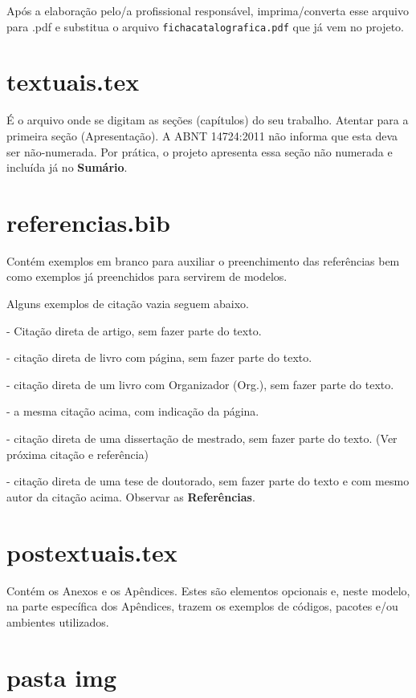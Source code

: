 \documentclass[a4paper,12pt,oneside,openright,extrafontsizes,openbib]{memoir}
\begin{document}
{{Após a elaboração pelo/a profissional responsável, imprima/converta esse arquivo para .pdf e substitua o arquivo \verb|fichacatalografica.pdf| que já vem no projeto.

\section{textuais.tex}

É o arquivo onde se digitam as seções (capítulos) do seu trabalho. Atentar para a primeira seção (Apresentação). A ABNT 14724:2011 não informa que esta deva ser não-numerada. Por prática, o projeto apresenta essa seção não numerada e incluída já no \textbf{Sumário}.

\section{referencias.bib}

Contém exemplos em branco para auxiliar o preenchimento das referências bem como exemplos já preenchidos para servirem de modelos.

Alguns exemplos de citação vazia seguem abaixo.

\cite{Smurf1980} - Citação direta de artigo, sem fazer parte do texto.

\cite[p. 654]{Vingadores2015} - citação direta de livro com página, sem fazer parte do texto.

 - citação direta de um livro com Organizador (Org.), sem fazer parte do texto.

 - a mesma citação acima, com indicação da página.

\cite{Vingadores2016} - citação direta de uma dissertação de mestrado, sem fazer parte do texto. (Ver próxima citação e referência)

\cite{Thor2017} - citação direta de uma tese de doutorado, sem fazer parte do texto e com mesmo autor da citação acima. Observar as \textbf{Referências}.

\section{postextuais.tex}

Contém os Anexos e os Apêndices. Estes são elementos opcionais e, neste modelo, na parte específica dos Apêndices, trazem os exemplos de códigos, pacotes e/ou ambientes utilizados.

\section{pasta img}

}}
\end{document}

